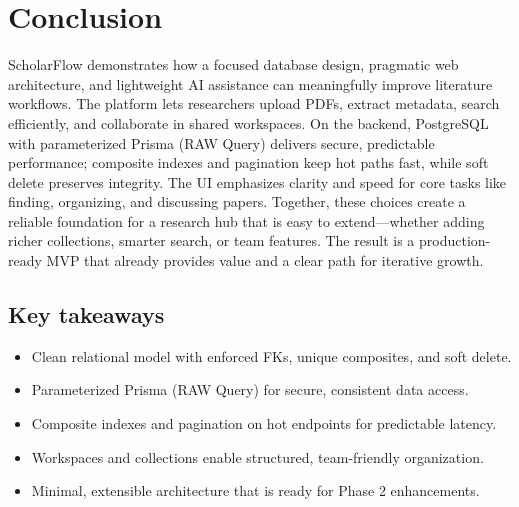 \chapter{Conclusion}
\label{ch:conclusion}

ScholarFlow demonstrates how a focused database design, pragmatic web architecture, and lightweight AI assistance can meaningfully improve literature workflows. The platform lets researchers upload PDFs, extract metadata, search efficiently, and collaborate in shared workspaces. On the backend, PostgreSQL with parameterized Prisma (RAW Query) delivers secure, predictable performance; composite indexes and pagination keep hot paths fast, while soft delete preserves integrity. The UI emphasizes clarity and speed for core tasks like finding, organizing, and discussing papers. Together, these choices create a reliable foundation for a research hub that is easy to extend—whether adding richer collections, smarter search, or team features. The result is a production-ready MVP that already provides value and a clear path for iterative growth.

\section*{Key takeaways}
\begin{itemize}[leftmargin=*,topsep=3pt,itemsep=2pt]
    \item Clean relational model with enforced FKs, unique composites, and soft delete.
    \item Parameterized Prisma (RAW Query) for secure, consistent data access.
    \item Composite indexes and pagination on hot endpoints for predictable latency.
    \item Workspaces and collections enable structured, team-friendly organization.
    \item Minimal, extensible architecture that is ready for Phase 2 enhancements.
\end{itemize}
